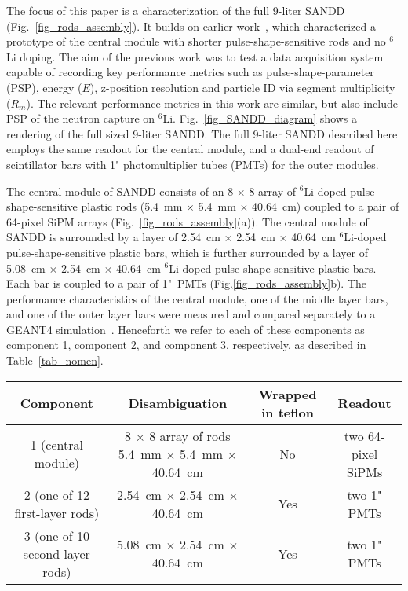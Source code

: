\documentclass[final,5p,times,twocolumn]{elsarticle}
\begin{document}
The focus of this paper is a %
characterization of the full 9-liter SANDD (Fig.~\ref{fig_rods_assembly}). It builds on earlier work~\cite{SANDD1}, which characterized a prototype of the central module with shorter pulse-shape-sensitive rods and no $^6$Li doping. 
The aim of the previous work was to test a data acquisition system capable of recording key performance metrics such as pulse-shape-parameter (PSP), energy ($E$), z-position resolution and particle ID via segment multiplicity ($R_m$). The relevant performance metrics in this work are similar, but also include %
PSP of the neutron capture on $^6$Li. Fig.~\ref{fig_SANDD_diagram} shows a rendering of the full sized 9-liter SANDD. The full 9-liter SANDD described here employs the same readout for the central module, and a dual-end readout of scintillator bars with 1" photomultiplier tubes (PMTs) for the outer  modules. 

The central module of SANDD consists of an 8 $\times$ 8 array of $^6$Li-doped pulse-shape-sensitive plastic rods (5.4~mm $\times$ 5.4~mm $\times$ 40.64~cm) coupled to a pair of 64-pixel SiPM arrays (Fig.~\ref{fig_rods_assembly}(a)). The central module of SANDD is surrounded by a layer of 2.54~cm $\times$ 2.54~cm $\times$ 40.64~cm $^6$Li-doped pulse-shape-sensitive plastic bars, which is further surrounded by a layer of 5.08~cm $\times$ 2.54~cm $\times$ 40.64~cm $^6$Li-doped pulse-shape-sensitive plastic bars. Each bar is coupled to a pair of 1"~PMTs (Fig.\ref{fig_rods_assembly}b). The performance characteristics of the central module, one of the middle layer bars, and one of the outer layer bars were measured and compared separately to a GEANT4 simulation~\cite{AGOSTINELLI2003250,ALLISON2016186}. Henceforth we refer to each of these components as component 1, component 2, and component 3, respectively, as described in Table~\ref{tab_nomen}.

\begin{table*}[ht!]
\caption{Nomenclature used throughout this paper.} 
\label{tab_nomen}
\centering
\begin{tabular}{|c|c|c|c|}
\hline
Component   & Disambiguation & Wrapped in teflon & Readout \\
\hline
\hline
1 (central module)  & 8 $\times$ 8 array of rods   5.4~mm $\times$ 5.4~mm $\times$ 40.64~cm & No & two 64-pixel SiPMs\\
2 (one of 12 first-layer rods)  & 2.54~cm $\times$ 2.54~cm $\times$ 40.64~cm & Yes & two 1" PMTs\\
3 (one of 10 second-layer rods)  & 5.08~cm $\times$ 2.54~cm $\times$ 40.64~cm & Yes & two 1" PMTs \\
\hline
\end{tabular}
\end{table*}
\end{document}
